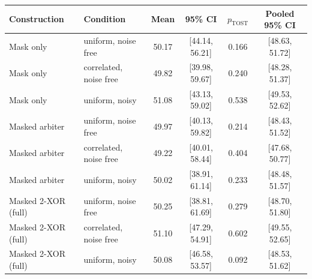 \begin{tabular}{llcccc}
\toprule
Construction & Condition & Mean & 95\% CI & $p_{\mathrm{TOST}}$ & Pooled 95\% CI \\
\midrule
Mask only & uniform, noise free & 50.17 & [44.14, 56.21] & 0.166 & [48.63, 51.72] \\
Mask only & correlated, noise free & 49.82 & [39.98, 59.67] & 0.240 & [48.28, 51.37] \\
Mask only & uniform, noisy & 51.08 & [43.13, 59.02] & 0.538 & [49.53, 52.62] \\
Masked arbiter & uniform, noise free & 49.97 & [40.13, 59.82] & 0.214 & [48.43, 51.52] \\
Masked arbiter & correlated, noise free & 49.22 & [40.01, 58.44] & 0.404 & [47.68, 50.77] \\
Masked arbiter & uniform, noisy & 50.02 & [38.91, 61.14] & 0.233 & [48.48, 51.57] \\
Masked 2-XOR (full) & uniform, noise free & 50.25 & [38.81, 61.69] & 0.279 & [48.70, 51.80] \\
Masked 2-XOR (full) & correlated, noise free & 51.10 & [47.29, 54.91] & 0.602 & [49.55, 52.65] \\
Masked 2-XOR (full) & uniform, noisy & 50.08 & [46.58, 53.57] & 0.092 & [48.53, 51.62] \\
\bottomrule
\end{tabular}
